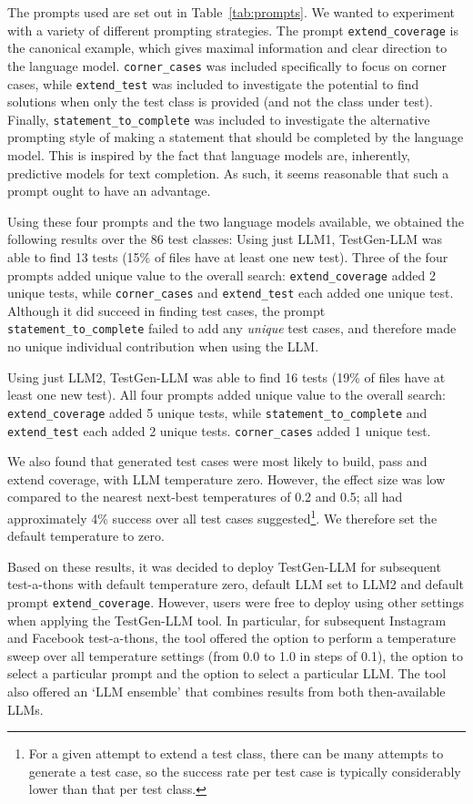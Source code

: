 \documentclass[sigconf,screen]{acmart}
\begin{document}
The prompts used are set out in Table~\ref{tab:prompts}.
We wanted to experiment with a variety of different prompting strategies.
The prompt {\tt extend\_coverage}  is the canonical example, which gives maximal information and clear direction to the language model.
{\tt corner\_cases} was included specifically to focus on corner cases, 
while 
{\tt extend\_test} was included to investigate the potential to find solutions when only the test class 
is provided (and not the class under test).
Finally, {\tt statement\_to\_complete} was included to investigate the alternative prompting style of making a statement that should be completed by the language model. 
This is inspired by the fact that  language models are, inherently, predictive models for text completion. 
As such, it seems reasonable that such a prompt ought to have an advantage.

  
Using these four prompts and the two language models available, we obtained the following results over the 86 test classes:
Using just LLM1, TestGen-LLM was able  to find 
13 tests (15\% of files have at least one new test).
Three of the four prompts added unique value to the overall search:
{\tt extend\_coverage} added 2 unique tests, while 
{\tt corner\_cases} and 
{\tt extend\_test}
each added one unique test.
Although it did succeed in finding test cases,  the prompt 
{\tt statement\_to\_complete} failed to add any {\em unique} test cases, and therefore made no unique individual contribution when using the LLM.


Using just LLM2, TestGen-LLM was able  to find 
16 tests (19\% of files have at least one new test).
All four prompts added unique value to the overall search:
{\tt extend\_coverage} 
added 5 unique tests,
while 
{\tt statement\_to\_complete} 
and 
{\tt extend\_test}  each added 2 unique tests.
{\tt corner\_cases} added 1 unique test.

We also found that generated test cases were most likely to build, pass and extend coverage, with LLM temperature zero. 
However, the effect size was low compared to the nearest next-best temperatures of 0.2 and 0.5; 
all had approximately 4\% success over all test cases suggested\footnote{For a given attempt to extend a test class, there can be many attempts to generate a test case, so the success rate per test case is typically considerably lower than that per test class.}. 
We therefore set the default temperature to zero. 


Based on these results, it was  decided to deploy TestGen-LLM for subsequent test-a-thons with default temperature zero, default LLM set to LLM2 and default prompt {\tt extend\_coverage}.
However, users were free  to deploy using other settings when applying the TestGen-LLM tool.
In particular, for subsequent Instagram and Facebook test-a-thons, the tool offered the option to perform a temperature sweep over all temperature settings (from 0.0 to 1.0 in steps of 0.1), 
the option to select a particular prompt and the option to select a particular LLM.
The tool also offered an `LLM ensemble' that combines results from both then-available  LLMs.
\end{document}
